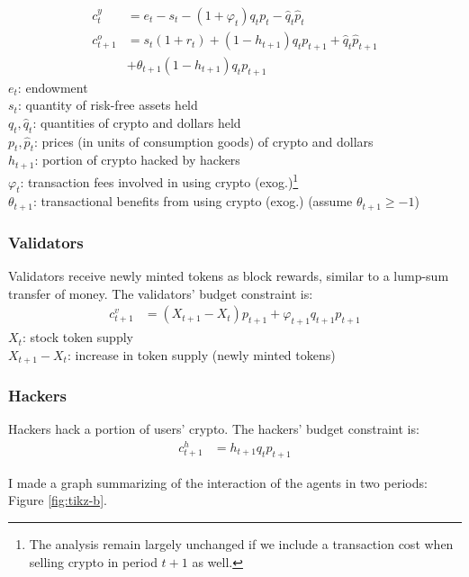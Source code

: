 \documentclass[12pt]{article}
\begin{document}
\begin{align}
    c_t^y &= e_t- s_t - (1+\varphi_t) q_t p_t - \hat{q}_t \hat{p}_t\\
    c_{t+1}^o &= s_t (1+r_t) + (1-h_{t+1}) q_t p_{t+1} + \hat{q}_t \hat{p}_{t+1} \nonumber \\
    &+ \theta_{t+1} (1-h_{t+1}) q_t p_{t+1} 
\end{align}
\noindent
$e_t$: endowment\\
$s_t$: quantity of risk-free assets held\\
$q_t, \hat{q}_t$: quantities of crypto and dollars held\\
$p_t, \hat{p}_t$: prices (in units of consumption goods) of crypto and dollars\\
$h_{t+1}$: portion of crypto hacked by hackers\\
$\varphi_t$: transaction fees involved in using crypto (exog.)\footnote{The analysis remain largely unchanged if we include a transaction cost when selling crypto in period $t+1$ as well.}\\
$\theta_{t+1}$: transactional benefits from using crypto (exog.) (assume $\theta_{t+1}\geq-1$)

\subsubsection{Validators}
Validators receive newly minted tokens as block rewards, similar to a lump-sum transfer of money. The validators' budget constraint is:
\begin{align}
    c_{t+1}^v &= (X_{t+1} - X_t) p_{t+1} + \varphi_{t+1} q_{t+1} p_{t+1}
\end{align}
\noindent
$X_t$: stock token supply\\
$X_{t+1} - X_t$: increase in token supply (newly minted tokens)

\subsubsection{Hackers}
Hackers hack a portion of users' crypto. The hackers' budget constraint is:
\begin{align}
    c_{t+1}^h &= h_{t+1} q_t p_{t+1}
\end{align}

\noindent
I made a graph summarizing of the interaction of the agents in two periods: Figure \ref{fig:tikz-b}.


\end{document}
